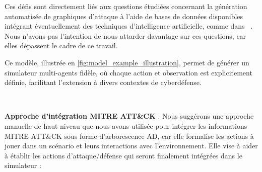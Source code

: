 Ces défis sont directement liés aux questions étudiées concernant la génération automatisée de graphiques d'attaque à l'aide de bases de données disponibles intégrant éventuellement des techniques d'intelligence artificielle, comme dans ~\cite{GFalco2018}. Nous n'avons pas l'intention de nous attarder davantage sur ces questions, car elles dépassent le cadre de ce travail.

Ce modèle, illustrée en \autoref{fig:model_example_illustration}, permet de générer un simulateur multi-agents fidèle, où chaque action et observation est explicitement définie, facilitant l’extension à divers contextes de cyberdéfense.

\

\noindent
\textbf{Approche d'intégration MITRE ATT\&CK} : Nous suggérons une approche manuelle de haut niveau que nous avons utilisée pour intégrer les informations MITRE ATT\&CK sous forme d'arborescence AD, car elle formalise les actions à jouer dans un scénario et leurs interactions avec l'environnement. Elle vise à aider à établir les actions d'attaque/défense qui seront finalement intégrées dans le simulateur :
%

